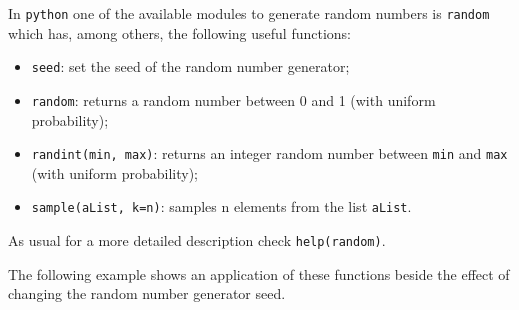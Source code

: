 In \texttt{python} one of the available modules to generate random numbers is \texttt{random} which has, among others, the following useful functions:
\begin{itemize}
\tightlist
\item
  \texttt{seed}: set the seed of the random number generator;
\item
  \texttt{random}: returns a random number between 0 and 1 (with uniform
  probability);
\item
  \texttt{randint(min,\ max)}: returns an integer random number between
  \texttt{min} and \texttt{max} (with uniform probability);
\item
  \texttt{sample(aList,\ k=n)}: samples n elements from the list
  \texttt{aList}.
\end{itemize}
\noindent
As usual for a more detailed description check \texttt{help(random)}.

The following example shows an application of these functions beside the effect of  changing the random number generator seed.

